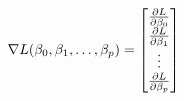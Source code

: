 \documentclass[preview]{standalone}
\begin{document}
\begin{align*}
\special{dvisvgm:raw <g id='unique000'>}\nabla{L(\beta_0, \beta_1, \dots, \beta_p)}=\begin{bmatrix}\frac{\partial L}{\partial \beta_0}\\\frac{\partial L}{\partial \beta_1}\\\vdots\\\frac{\partial L}{\partial \beta_p}\end{bmatrix}\special{dvisvgm:raw </g>}
\end{align*}
\end{document}
